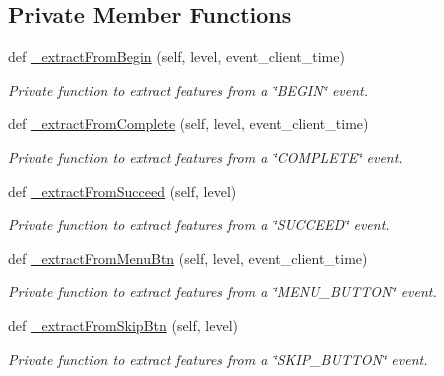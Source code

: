 \subsection*{Private Member Functions}
\begin{DoxyCompactItemize}
\item 
def \mbox{\hyperlink{classfeature__extractors_1_1_wave_extractor_1_1_wave_extractor_ae5c40040ef91149c3453ccccb50e82aa}{\+\_\+extract\+From\+Begin}} (self, level, event\+\_\+client\+\_\+time)
\begin{DoxyCompactList}\small\item\em Private function to extract features from a \char`\"{}\+B\+E\+G\+I\+N\char`\"{} event. \end{DoxyCompactList}\item 
def \mbox{\hyperlink{classfeature__extractors_1_1_wave_extractor_1_1_wave_extractor_a1d30be62a12e61203e415f6cb2303863}{\+\_\+extract\+From\+Complete}} (self, level, event\+\_\+client\+\_\+time)
\begin{DoxyCompactList}\small\item\em Private function to extract features from a \char`\"{}\+C\+O\+M\+P\+L\+E\+T\+E\char`\"{} event. \end{DoxyCompactList}\item 
def \mbox{\hyperlink{classfeature__extractors_1_1_wave_extractor_1_1_wave_extractor_a1ad2f370fc77ce5e9511733860df97eb}{\+\_\+extract\+From\+Succeed}} (self, level)
\begin{DoxyCompactList}\small\item\em Private function to extract features from a \char`\"{}\+S\+U\+C\+C\+E\+E\+D\char`\"{} event. \end{DoxyCompactList}\item 
def \mbox{\hyperlink{classfeature__extractors_1_1_wave_extractor_1_1_wave_extractor_a07c7930e580d7ca19cbeda932231addd}{\+\_\+extract\+From\+Menu\+Btn}} (self, level, event\+\_\+client\+\_\+time)
\begin{DoxyCompactList}\small\item\em Private function to extract features from a \char`\"{}\+M\+E\+N\+U\+\_\+\+B\+U\+T\+T\+O\+N\char`\"{} event. \end{DoxyCompactList}\item 
def \mbox{\hyperlink{classfeature__extractors_1_1_wave_extractor_1_1_wave_extractor_a32ec436f8e919c9085f649536891829f}{\+\_\+extract\+From\+Skip\+Btn}} (self, level)
\begin{DoxyCompactList}\small\item\em Private function to extract features from a \char`\"{}\+S\+K\+I\+P\+\_\+\+B\+U\+T\+T\+O\+N\char`\"{} event. \end{DoxyCompactList}\item 

\end{DoxyCompactItemize}
